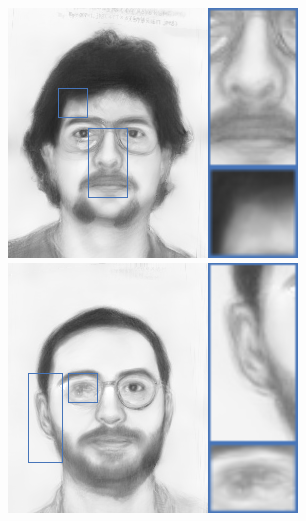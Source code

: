 \documentclass[10pt,twocolumn,letterpaper]{article}
\begin{document}
\begin{figure}[htbp]
{\begin{minipage}[b]{0.13\linewidth}
\includegraphics[width=0.99\linewidth]{img/sketch_result/ssd_s3.png}
\includegraphics[width=0.99\linewidth]{img/sketch_result/ssd_s4.png}
\end{minipage}
}
\end{figure}
\end{document}
